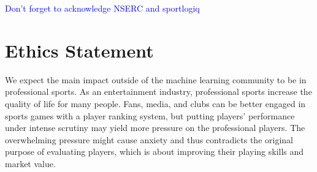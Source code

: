 \documentclass{article}
\begin{document}
\textcolor{blue}{Don't forget to acknowledge NSERC and sportlogiq}

\newpage
\section*{Ethics Statement}
We expect the main impact outside of the machine learning community to be in professional sports. As an entertainment industry, professional sports increase the quality of life for many people. Fans, media, and clubs can be better engaged in sports games with a player ranking system, but putting players’ performance under intense scrutiny may yield more pressure on the professional players. The overwhelming pressure might cause anxiety and thus contradicts the original purpose of evaluating players, which is about improving their playing skills and market value.




\end{document}
